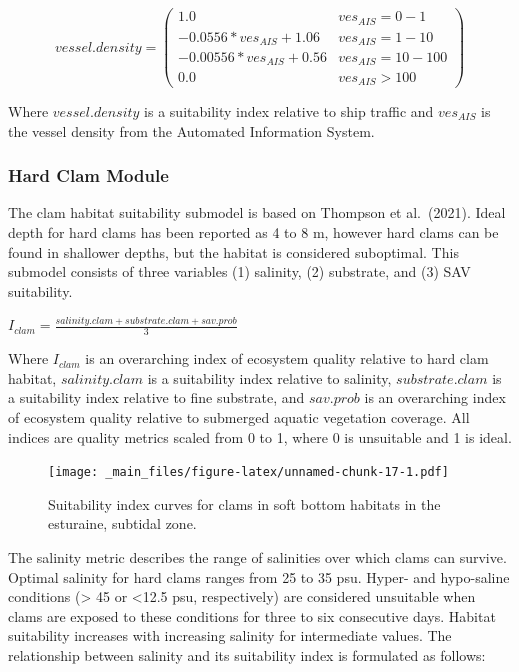 \documentclass[
]{book}
\begin{document}
\[vessel.density = \begin{pmatrix} 1.0 & ves_{AIS}=0-1\\
-0.0556*ves_{AIS}+1.06 & ves_{AIS}=1-10\\
-0.00556*ves_{AIS}+0.56 & ves_{AIS}=10-100\\
0.0 & ves_{AIS}>100
\end{pmatrix}\]

Where \(vessel.density\) is a suitability index relative to ship traffic and \(ves_{AIS}\) is the vessel density from the Automated Information System.

\hypertarget{hard-clam-module}{%
\subsubsection{Hard Clam Module}\label{hard-clam-module}}

The clam habitat suitability submodel is based on Thompson et al.~(2021). Ideal depth for hard clams has been reported as 4 to 8 m, however hard clams can be found in shallower depths, but the habitat is considered suboptimal. This submodel consists of three variables (1) salinity, (2) substrate, and (3) SAV suitability.

\(I_{clam} = \frac{salinity.clam + substrate.clam + sav.prob}{3}\)

Where \(I_{clam}\) is an overarching index of ecosystem quality relative to hard clam habitat, \(salinity.clam\) is a suitability index relative to salinity, \(substrate.clam\) is a suitability index relative to fine substrate, and \(sav.prob\) is an overarching index of ecosystem quality relative to submerged aquatic vegetation coverage. All indices are quality metrics scaled from 0 to 1, where 0 is unsuitable and 1 is ideal.

\begin{figure}
\centering
\texttt{[image: \_main\_files/figure-latex/unnamed-chunk-17-1.pdf]}
\caption{\label{fig:unnamed-chunk-17}Suitability index curves for clams in soft bottom habitats in the esturaine, subtidal zone.}
\end{figure}

The salinity metric describes the range of salinities over which clams can survive. Optimal salinity for hard clams ranges from 25 to 35 psu. Hyper- and hypo-saline conditions (\textgreater{} 45 or \textless12.5 psu, respectively) are considered unsuitable when clams are exposed to these conditions for three to six consecutive days. Habitat suitability increases with increasing salinity for intermediate values. The relationship between salinity and its suitability index is formulated as follows:
\end{document}
